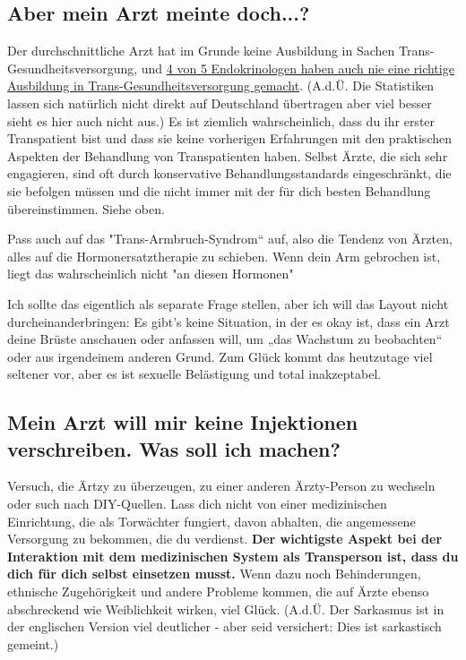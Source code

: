\documentclass{article}
\begin{document}
{{{\subsection{Aber mein Arzt meinte doch...?}

Der durchschnittliche Arzt hat im Grunde keine Ausbildung in Sachen Trans-Gesundheitsversorgung, und \href{https://www.endocrine.org/news-and-advocacy/news-room/2017/endocrinologists-want-training-in-transgender-care }{4 von 5 Endokrinologen haben auch nie eine richtige Ausbildung in Trans-Gesundheitsversorgung gemacht}. (A.d.Ü. Die Statistiken lassen sich natürlich nicht direkt auf Deutschland übertragen aber viel besser sieht es hier auch nicht aus.) Es ist ziemlich wahrscheinlich, dass du ihr erster Transpatient bist und dass sie keine vorherigen Erfahrungen mit den praktischen Aspekten der Behandlung von Transpatienten haben. Selbst Ärzte, die sich sehr engagieren, sind oft durch konservative Behandlungsstandards eingeschränkt, die sie befolgen müssen und die nicht immer mit der für dich besten Behandlung übereinstimmen. Siehe oben.

Pass auch auf das "Trans-Armbruch-Syndrom“ auf, also die Tendenz von Ärzten, alles auf die Hormonersatztherapie zu schieben. Wenn dein Arm gebrochen ist, liegt das wahrscheinlich nicht "an diesen Hormonen"

Ich sollte das eigentlich als separate Frage stellen, aber ich will das Layout nicht durcheinanderbringen: Es gibt's keine Situation, in der es okay ist, dass ein Arzt deine Brüste anschauen oder anfassen will, um „das Wachstum zu beobachten“ oder aus irgendeinem anderen Grund. Zum Glück kommt das heutzutage viel seltener vor, aber es ist sexuelle Belästigung und total inakzeptabel.

\subsection{Mein Arzt will mir keine Injektionen verschreiben. Was soll ich machen?}

Versuch, die Ärtzy zu überzeugen, zu einer anderen Ärzty-Person zu wechseln oder such nach DIY-Quellen. Lass dich nicht von einer medizinischen Einrichtung, die als Torwächter fungiert, davon abhalten, die angemessene Versorgung zu bekommen, die du verdienst. \textbf{Der wichtigste Aspekt bei der Interaktion mit dem medizinischen System als Transperson ist, dass du dich für dich selbst einsetzen musst. } Wenn dazu noch Behinderungen, ethnische Zugehörigkeit und andere Probleme kommen, die auf Ärzte ebenso abschreckend wie Weiblichkeit wirken, viel Glück. (A.d.Ü. Der Sarkasmus ist in der englischen Version viel deutlicher - aber seid versichert: Dies ist sarkastisch gemeint.)

}}}
\end{document}
